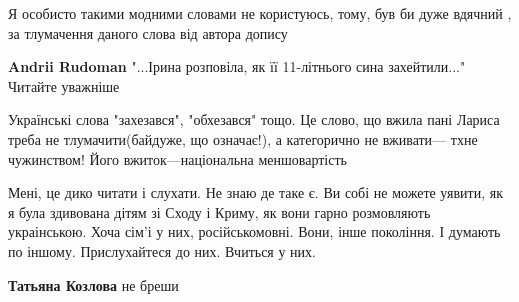 \begin{itemize}
\begin{itemize}
Я особисто такими модними словами не користуюсь,
тому, був би дуже вдячний , за тлумачення даного слова від автора допису \Smiley[1.0][yellow]

\begin{itemize}
 
\textbf{Andrii Rudoman} "...Ірина розповіла, як її 11-літнього сина захейтили..."
Читайте уважніше \Smiley[1.0][yellow]
\end{itemize}

 

Українські слова "захезався", "обхезався" тощо. Це слово, що вжила пані Лариса
треба не тлумачити(байдуже, що означає!), а категорично не вживати— тхне
чужинством! Його вжиток—національна меншовартість

\end{itemize}

 

Мені, це дико читати і слухати. Не знаю де таке є. Ви собі не можете уявити, як
я була здивована дітям зі Сходу і Криму, як вони гарно розмовляють украінською.
Хоча сім'і у них, російськомовні. Вони, інше покоління. І думають по іншому.
Прислухайтеся до них. Вчиться у них.

\begin{itemize}
 
\textbf{Татьяна Козлова} не бреши
\end{itemize}

 


\end{itemize}
